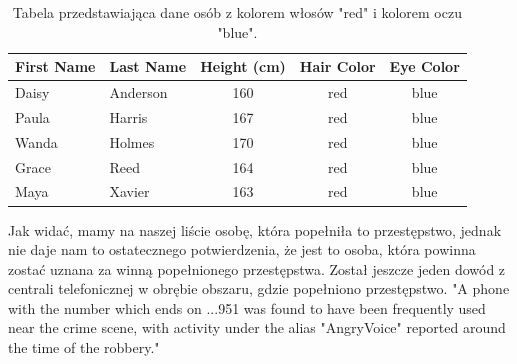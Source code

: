 \documentclass[a4paper,12pt]{article}
\begin{document}
\begin{table}[h!]
\centering
\begin{tabular}{|l|l|c|c|c|}
\hline
\textbf{First Name} & \textbf{Last Name} & \textbf{Height (cm)} & \textbf{Hair Color} & \textbf{Eye Color} \\ \hline
Daisy               & Anderson           & 160                 & red                 & blue               \\ \hline
Paula               & Harris             & 167                 & red                 & blue               \\ \hline
Wanda               & Holmes             & 170                 & red                 & blue               \\ \hline
Grace               & Reed               & 164                 & red                 & blue               \\ \hline
Maya                & Xavier             & 163                 & red                 & blue               \\ \hline
\end{tabular}
\caption{Tabela przedstawiająca dane osób z kolorem włosów "red" i kolorem oczu "blue".}
\label{tab:person_data_with_eyes}
\end{table}

Jak widać, mamy na naszej liście osobę, która popełniła to przestępstwo, jednak nie daje nam to ostatecznego potwierdzenia, że jest to osoba, która powinna zostać uznana za winną popełnionego przestępstwa. Został jeszcze jeden dowód z centrali telefonicznej w obrębie obszaru, gdzie popełniono przestępstwo.
\newline
\newline
"A phone with the number which ends on ...951 was found to have been frequently used near the crime scene, with activity under the alias "AngryVoice" reported around the time of the robbery."
\end{document}
